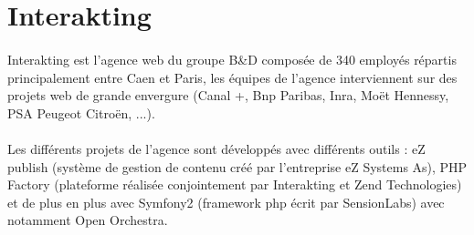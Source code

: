 \section{Interakting}

        \paragraph{}
        Interakting est l'agence web du groupe B\&D  composée de 340 employés répartis principalement entre Caen et Paris, les équipes de l'agence interviennent sur des projets web  de grande envergure (Canal +, Bnp Paribas, Inra, Moët Hennessy, PSA Peugeot Citroën, ...).
        \paragraph{}
        Les différents projets de l'agence sont développés avec différents outils : eZ publish (système de gestion de contenu créé par l'entreprise eZ Systems As), PHP Factory (plateforme réalisée conjointement par Interakting et Zend Technologies) et de plus en plus avec Symfony2 (framework php écrit par SensionLabs) avec notamment Open Orchestra.

        
        
        